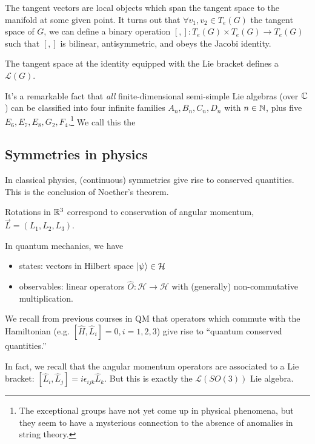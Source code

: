 The tangent vectors are local objects which span the tangent space to the manifold at some given point. It turns out that $\forall v_1,v_2\in T_e(G)$ the tangent space of $G$, we can define a binary operation $[,]:T_e(G)\times T_e(G) \to T_e(G)$ such that $[,]$ is bilinear, antisymmetric, and obeys the Jacobi identity. 
\begin{defn}
The tangent space at the identity equipped with the Lie bracket defines a  $\mathcal{L}(G).$
\end{defn}

It's a remarkable fact that \emph{all} finite-dimensional semi-simple Lie algebras (over $\mathbb{C}$) can be classified into four infinite families $A_n, B_n, C_n,D_n$ with $n\in \mathbb{N}$, plus five  $E_6,E_7,E_8,G_2,F_4$.\footnote{The exceptional groups have not yet come up in physical phenomena, but they seem to have a mysterious connection to the absence of anomalies in string theory.} We call this the 

\subsection*{Symmetries in physics}
In classical physics, (continuous) symmetries give rise to conserved quantities. This is the conclusion of Noether's theorem.
\begin{exm}
Rotations in $\mathbb{R}^3$ correspond to conservation of angular momentum, $\vec{L}=(L_1,L_2,L_3)$.
\end{exm}
In quantum mechanics, we have
\begin{itemize}
    \item states: vectors in Hilbert space $\left| \psi \right>\in \mathcal{H}$
    \item observables: linear operators $\hat O: \mathcal{H}\to\mathcal{H}$ with (generally) non-commutative multiplication.
\end{itemize}
We recall from previous courses in QM that operators which commute with the Hamiltonian (e.g. $[\hat H, \hat L_i]=0, i= 1,2,3$) give rise to ``quantum conserved quantities.''

In fact, we recall that the angular momentum operators are associated to a Lie bracket: $[\hat L_i, \hat L_j]=i \epsilon_{ijk} \hat L_k$. But this is exactly the $\mathcal{L}(SO(3))$ Lie algebra. 

